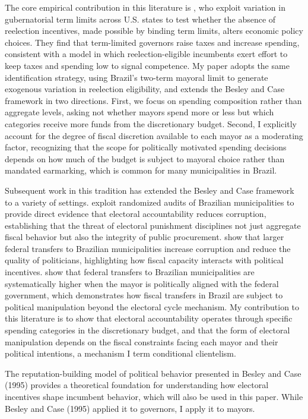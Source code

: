 \documentclass[12pt, a4paper]{article}
\begin{document}
The core empirical contribution in this literature is , who exploit variation in gubernatorial term limits across U.S. states to test whether the absence of reelection incentives, made possible by binding term limits, alters economic policy choices. They find that term-limited governors raise taxes and increase spending, consistent with a model in which reelection-eligible incumbents exert effort to keep taxes and spending low to signal competence. My paper adopts the same identification strategy, using Brazil's two-term mayoral limit to generate exogenous variation in reelection eligibility, and extends the Besley and Case framework in two directions. First, we focus on spending composition rather than aggregate levels, asking not whether mayors spend more or less but which categories receive more funds from the discretionary budget. Second, I explicitly account for the degree of fiscal discretion available to each mayor as a moderating factor, recognizing that the scope for politically motivated spending decisions depends on how much of the budget is subject to mayoral choice rather than mandated earmarking, which is common for many municipalities in Brazil.

Subsequent work in this tradition has extended the Besley and Case framework to a variety of settings.  exploit randomized audits of Brazilian municipalities to provide direct evidence that electoral accountability reduces corruption, establishing that the threat of electoral punishment disciplines not just aggregate fiscal behavior but also the integrity of public procurement.  show that larger federal transfers to Brazilian municipalities increase corruption and reduce the quality of politicians, highlighting how fiscal capacity interacts with political incentives.  show that federal transfers to Brazilian municipalities are systematically higher when the mayor is politically aligned with the federal government, which demonstrates how fiscal transfers in Brazil are subject to political manipulation beyond the electoral cycle mechanism. My contribution to this literature is to show that electoral accountability operates through specific spending categories in the discretionary budget, and that the form of electoral manipulation depends on the fiscal constraints facing each mayor and their political intentions, a mechanism I term conditional clientelism.

The reputation-building model of political behavior presented in Besley and Case (1995) provides a theoretical foundation for understanding how electoral incentives shape incumbent behavior, which will also be used in this paper. While Besley and Case (1995) applied it to governors, I apply it to mayors.
\end{document}
